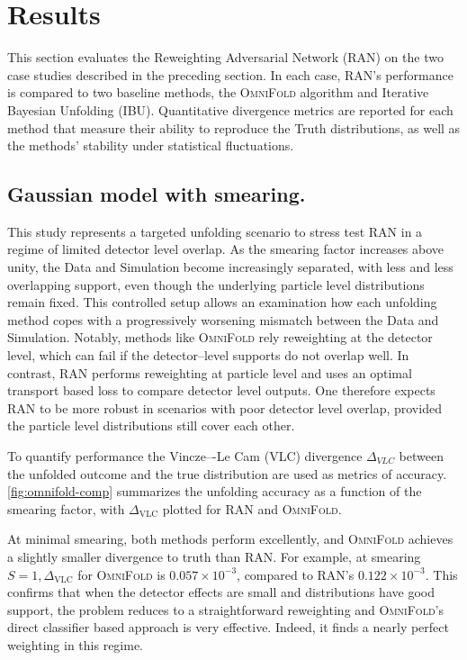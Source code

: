 {{\section{Results}
    \label{sec:ran-results}
    This section evaluates the Reweighting Adversarial Network (RAN) on the two case studies described in the preceding section.
    In each case, RAN’s performance is compared to two baseline methods, the \textsc{OmniFold} algorithm and Iterative Bayesian Unfolding (IBU).
    Quantitative divergence metrics are reported for each method that measure their ability to reproduce the Truth distributions, as well as the methods’ stability under statistical fluctuations.

    \subsection{Gaussian model with smearing.}
        This study represents a targeted unfolding scenario to stress test RAN in a regime of limited detector level overlap.
        As the smearing factor increases above unity, the Data and Simulation become increasingly separated, with less and less overlapping support, even though the underlying particle level distributions remain fixed.
        This controlled setup allows an examination how each unfolding method copes with a progressively worsening mismatch between the Data and Simulation.
        Notably, methods like \textsc{OmniFold} rely reweighting at the detector level, which can fail if the detector--level supports do not overlap well.
        In contrast, RAN performs reweighting at particle level and uses an optimal transport based loss to compare detector level outputs.
        One therefore expects RAN to be more robust in scenarios with poor detector level overlap, provided the particle level distributions still cover each other.

        To quantify performance the Vincze–-Le Cam (VLC) divergence $\Delta_{VLC}$ between the unfolded outcome and the true distribution are used as metrics of accuracy.
        \cref{fig:omnifold-comp} summarizes the unfolding accuracy as a function of the smearing factor, with $\Delta_{\text{VLC}}$ plotted for RAN and \textsc{OmniFold}.

        At minimal smearing, both methods perform excellently, and \textsc{OmniFold} achieves a slightly smaller divergence to truth than RAN.
        For example, at smearing $S = 1, \Delta_{\text{VLC}}$ for \textsc{OmniFold} is $0.057\times10^{-3}$, compared to RAN’s $0.122\times10^{-3}$.
        This confirms that when the detector effects are small and distributions have good support, the problem reduces to a straightforward reweighting and \textsc{OmniFold}’s direct classifier based approach is very effective.
        Indeed, it finds a nearly perfect weighting in this regime.

}}
